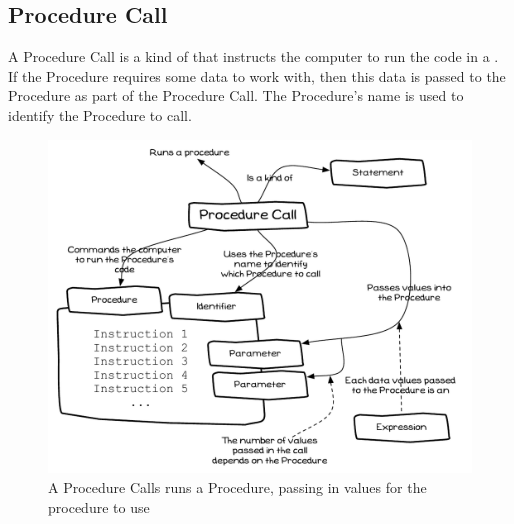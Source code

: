 \clearpage
\subsection{Procedure Call} %
\label{sub:procedure call}

A Procedure Call is a kind of  that instructs the computer to run the code in a . If the Procedure requires some data to work with, then this data is passed to the Procedure as part of the Procedure Call. The Procedure's name is used to identify the Procedure to call.

\begin{figure}[h]
   \centering
   \includegraphics[width=\textwidth]{./topics/program-creation/diagrams/ProcedureCall} 
   \caption[Procedure Call Concept Diagram]{A Procedure Calls runs a Procedure, passing in values for the procedure to use}
   \label{fig:program-creation-procedure call}
\end{figure}



